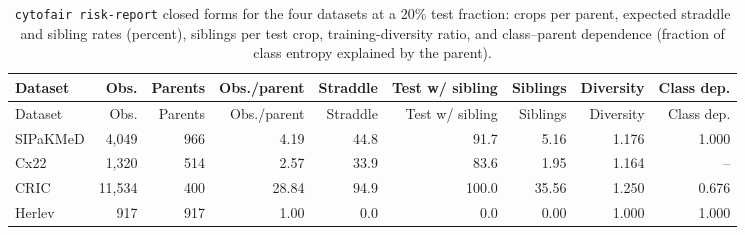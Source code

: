 {\scriptsize
\setlength{\tabcolsep}{3.5pt}
\begin{longtable}{lrrrrrrrr}
\caption{\texttt{cytofair risk-report} closed forms for the four datasets at a 20\% test fraction: crops per parent, expected straddle and sibling rates (percent), siblings per test crop, training-diversity ratio, and class--parent dependence (fraction of class entropy explained by the parent).}\label{r:tab:risk}\\
\toprule
Dataset & Obs. & Parents & Obs./parent & Straddle & Test w/ sibling & Siblings & Diversity & Class dep. \\
\midrule
\endfirsthead
\toprule
Dataset & Obs. & Parents & Obs./parent & Straddle & Test w/ sibling & Siblings & Diversity & Class dep. \\
\midrule
\endhead
\bottomrule
\endfoot
SIPaKMeD & 4,049 & 966 & 4.19 & 44.8 & 91.7 & 5.16 & 1.176 & 1.000 \\
Cx22 & 1,320 & 514 & 2.57 & 33.9 & 83.6 & 1.95 & 1.164 & -- \\
CRIC & 11,534 & 400 & 28.84 & 94.9 & 100.0 & 35.56 & 1.250 & 0.676 \\
Herlev & 917 & 917 & 1.00 & 0.0 & 0.0 & 0.00 & 1.000 & 1.000 \\
\end{longtable}
}
